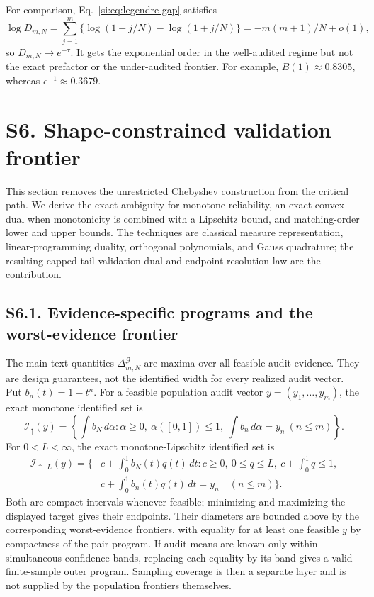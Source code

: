 For comparison, Eq.~\ref{si:eq:legendre-gap} satisfies
\begin{equation}
\log D_{m,N}
=\sum_{j=1}^m\{\log(1-j/N)-\log(1+j/N)\}
=-m(m+1)/N+o(1),
\label{si:eq:legendre-phase}
\end{equation}
so $D_{m,N}\to e^{-\tau}$. It gets the exponential order in the well-audited regime but not the exact prefactor or the under-audited frontier. For example, $B(1)\approx0.8305$, whereas $e^{-1}\approx0.3679$.

\section*{S6. Shape-constrained validation frontier}

This section removes the unrestricted Chebyshev construction from the critical path. We derive the exact ambiguity for monotone reliability, an exact convex dual when monotonicity is combined with a Lipschitz bound, and matching-order lower and upper bounds. The techniques are classical measure representation, linear-programming duality, orthogonal polynomials, and Gauss quadrature; the resulting capped-tail validation dual and endpoint-resolution law are the contribution.

\subsection*{S6.1. Evidence-specific programs and the worst-evidence frontier}

The main-text quantities $\Delta^{\mathcal G}_{m,N}$ are maxima over all
feasible audit evidence. They are design guarantees, not the identified width
for every realized audit vector. Put $b_n(t)=1-t^n$. For a feasible population
audit vector $y=(y_1,\ldots,y_m)$, the exact monotone identified set is
\begin{equation}
\mathcal I_\uparrow(y)
=\left\{\int b_N\,d\alpha:
\alpha\ge0,\ \alpha([0,1])\le1,\
\int b_n\,d\alpha=y_n\ (n\le m)\right\}.
\label{si:eq:evidence-monotone-program}
\end{equation}
For $0<L<\infty$, the exact monotone-Lipschitz identified set is
\begin{align}
\mathcal I_{\uparrow,L}(y)
=\bigg\{&c+\int_0^1b_N(t)q(t)\,dt:
c\ge0,\ 0\le q\le L,\ c+\int_0^1q\le1,\nonumber\\
&c+\int_0^1b_n(t)q(t)\,dt=y_n\quad(n\le m)\bigg\}.
\label{si:eq:evidence-lipschitz-program}
\end{align}
Both are compact intervals whenever feasible; minimizing and maximizing the
displayed target gives their endpoints. Their diameters are bounded above by
the corresponding worst-evidence frontiers, with equality for at least one
feasible $y$ by compactness of the pair program. If audit means are known only
within simultaneous confidence bands, replacing each equality by its band
gives a valid finite-sample outer program. Sampling coverage is then a separate
layer and is not supplied by the population frontiers themselves.

